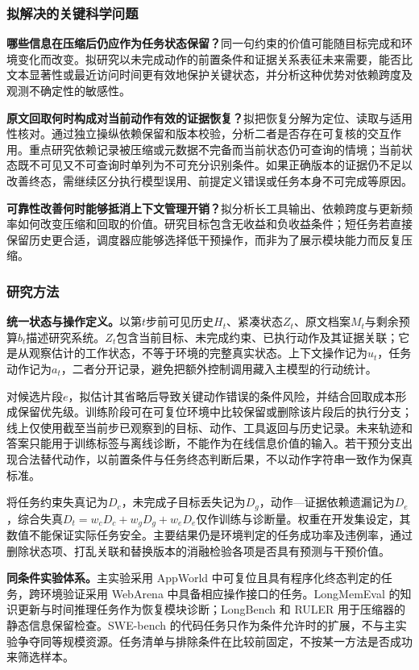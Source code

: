 \subsubsection{拟解决的关键科学问题}
\textbf{哪些信息在压缩后仍应作为任务状态保留？}同一句约束的价值可能随目标完成和环境变化而改变。拟研究以未完成动作的前置条件和证据关系表征未来需要，能否比文本显著性或最近访问时间更有效地保护关键状态，并分析这种优势对依赖跨度及观测不确定性的敏感性。

\textbf{原文回取何时构成对当前动作有效的证据恢复？}拟把恢复分解为定位、读取与适用性核对。通过独立操纵依赖保留和版本校验，分析二者是否存在可复核的交互作用。重点研究依赖记录被压缩或元数据不完备而当前状态仍可查询的情境；当前状态既不可见又不可查询时单列为不可充分识别条件。如果正确版本的证据仍不足以改善终态，需继续区分执行模型误用、前提定义错误或任务本身不可完成等原因。

\textbf{可靠性改善何时能够抵消上下文管理开销？}拟分析长工具输出、依赖跨度与更新频率如何改变压缩和回取的价值。研究目标包含无收益和负收益条件；短任务若直接保留历史更合适，调度器应能够选择低干预操作，而非为了展示模块能力而反复压缩。

\subsubsection{研究方法}
\textbf{统一状态与操作定义。}以第\(t\)步前可见历史\(H_t\)、紧凑状态\(Z_t\)、原文档案\(M_t\)与剩余预算\(b_t\)描述研究系统。\(Z_t\)包含当前目标、未完成约束、已执行动作及其证据关联；它是从观察估计的工作状态，不等于环境的完整真实状态。上下文操作记为\(u_t\)，任务动作记为\(a_t\)，二者分开记录，避免把额外控制调用藏入主模型的行动统计。

对候选片段\(e\)，拟估计其省略后导致关键动作错误的条件风险，并结合回取成本形成保留优先级。训练阶段可在可复位环境中比较保留或删除该片段后的执行分支；线上仅使用截至当前步已观察到的目标、动作、工具返回与历史记录。未来轨迹和答案只能用于训练标签与离线诊断，不能作为在线信息价值的输入。若干预分支出现合法替代动作，以前置条件与任务终态判断后果，不以动作字符串一致作为保真标准。

将任务约束失真记为\(D_c\)，未完成子目标丢失记为\(D_g\)，动作—证据依赖遗漏记为\(D_e\)，综合失真\(D_t=w_cD_c+w_gD_g+w_eD_e\)仅作训练与诊断量。权重在开发集设定，其数值不能保证实际任务安全。主要结果仍是环境判定的任务成功率及违例率，通过删除状态项、打乱关联和替换版本的消融检验各项是否具有预测与干预价值。

\textbf{同条件实验体系。}主实验采用 AppWorld 中可复位且具有程序化终态判定的任务\cite{appworld}，跨环境验证采用 WebArena 中具备相应操作接口的任务\cite{webarena}。LongMemEval 的知识更新与时间推理任务作为恢复模块诊断\cite{longmemeval}；LongBench 和 RULER 用于压缩器的静态信息保留检查\cite{longbench,ruler}。SWE-bench 的代码任务只作为条件允许时的扩展，不与主实验争夺同等规模资源。任务清单与排除条件在比较前固定，不按某一方法是否成功来筛选样本。

